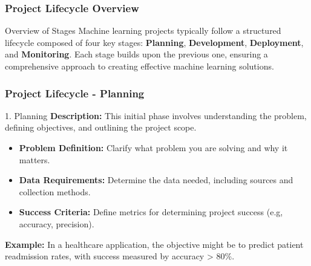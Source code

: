 \documentclass[aspectratio=169]{beamer}
\begin{document}
\begin{frame}[fragile]
    \frametitle{Project Lifecycle Overview}
    \begin{block}{Overview of Stages}
        Machine learning projects typically follow a structured lifecycle composed of four key stages: 
        \textbf{Planning}, \textbf{Development}, \textbf{Deployment}, and \textbf{Monitoring}. 
        Each stage builds upon the previous one, ensuring a comprehensive approach to creating effective machine learning solutions.
    \end{block}
\end{frame}

\begin{frame}[fragile]
    \frametitle{Project Lifecycle - Planning}
    \begin{block}{1. Planning}
        \textbf{Description:} This initial phase involves understanding the problem, defining objectives, and outlining the project scope.
        \begin{itemize}
            \item \textbf{Problem Definition:} Clarify what problem you are solving and why it matters.
            \item \textbf{Data Requirements:} Determine the data needed, including sources and collection methods.
            \item \textbf{Success Criteria:} Define metrics for determining project success (e.g, accuracy, precision).
        \end{itemize}
        \textbf{Example:} In a healthcare application, the objective might be to predict patient readmission rates, with success measured by accuracy > 80\%.
    \end{block}
\end{frame}
\end{document}
